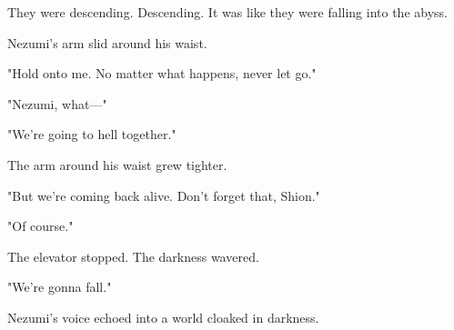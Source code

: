 They were descending. Descending. It was like they were falling into the
abyss.

Nezumi's arm slid around his waist.

"Hold onto me. No matter what happens, never let go."

"Nezumi, what---"

"We're going to hell together."

The arm around his waist grew tighter.

"But we're coming back alive. Don't forget that, Shion."

"Of course."

The elevator stopped. The darkness wavered.

"We're gonna fall."

Nezumi's voice echoed into a world cloaked in darkness.